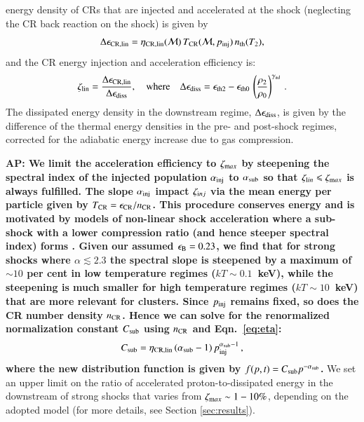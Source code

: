 \documentclass[a4paper,fleqn,usenatbib]{mnras}
\newcommand\eb{\epsilon_\rmn{B}}
\def\AP#1{{\bf  AP: #1}}
\begin{document}
{energy density of CRs that are injected and accelerated at the shock
(neglecting the CR back reaction on the shock) is given by
\begin{equation}
\label{eq:CR_energy} 
  \Delta\epsilon_{\mathrm{CR,lin}} =
  \eta_{\mathrm{CR,lin}}(\mathcal{M})\,T_{\mathrm{CR}}(\mathcal{M},p_{\mathrm{inj}})\,n_{\mathrm{th}}(T_2),
\end{equation}
and the CR energy injection and acceleration efficiency is:
\begin{equation}
  \zeta_{\mathrm{lin}} =
  \frac{\Delta\epsilon_{\mathrm{CR,lin}}}{\Delta\epsilon_{\mathrm{diss}}},
   \quad\mbox{where}\quad
  \Delta\epsilon_{\mathrm{diss}} = \epsilon_{\mathrm{th2}} - \epsilon_{\mathrm{th0}}\,\left(\frac{\rho_2}{\rho_0}\right)^{\gamma_{\mathrm{ad}}}\,.
\label{eqn:energy_frac}  
\end{equation}
The dissipated energy density in the downstream regime,
$\Delta\epsilon_{\mathrm{diss}}$, is given by the difference of the thermal
energy densities in the pre- and post-shock regimes, corrected for the
adiabatic energy increase due to gas compression.}

\AP{We limit the acceleration efficiency to $\zeta_{{\mathrm{m}}ax}$ by
  steepening the spectral index of the injected population
  $\alpha_{\mathrm{inj}}$ to $\alpha_{\mathrm{sub}}$ so that $\zeta_{{\mathrm{l}}in}
  \leqslant \zeta_{{\mathrm{m}}ax}$ is always fulfilled. The slope
  $\alpha_{\mathrm{inj}}$ impact $\zeta_{{\mathrm{i}}nj}$ via the mean energy per
  particle given by $T_{\mathrm{CR}} = \epsilon_{\mathrm{CR}}/n_{\mathrm{CR}}$. This
  procedure conserves energy and is motivated by models of non-linear
  shock acceleration where a sub-shock with a lower compression ratio
  (and hence steeper spectral index) forms
  \citep[e.g.,][]{2000ApJ...540..292E}. Given our assumed $\eb=0.23$,
  we find that for strong shocks where $\alpha \lesssim 2.3$ the
  spectral slope is steepened by a maximum of $\sim 10$ per cent in
  low temperature regimes ($kT\sim 0.1$~keV), while the steepening is
  much smaller for high temperature regimes ($kT\sim 10$~keV) that are
  more relevant for clusters. Since $p_{\rm inj}$ remains fixed, so
  does the CR number density $n_{\mathrm{CR}}$. Hence we can solve for the
  renormalized normalization constant $C_{\mathrm{sub}}$ using $n_{\mathrm{CR}}$
  and Eqn.~\ref{eq:eta}:
\begin{equation}
  \label{eq:Cp_sub}
  C_{\mathrm{sub}}=\eta_{\mathrm{CR,lin}}\,(\alpha_{\mathrm{sub}}-1)\,p_{\mathrm{inj}}^{\alpha_{\mathrm{sub}}-1}\,,
\end{equation}
where the new distribution function is given by $f(p,t)= C_{\mathrm{sub}}
p^{-\alpha_{\mathrm{sub}}}$.} We set an upper limit on the ratio of
accelerated proton-to-dissipated energy in the downstream of strong
shocks that varies from $\zeta_{{\mathrm{m}}ax} \sim 1-10\%$, depending on
the adopted model (for more details, see Section \ref{sec:results}).
\end{document}

